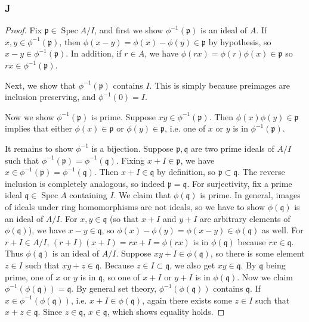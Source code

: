 \documentclass{article}
\newcommand{\frkp}{\mathfrak{p}}
\newcommand{\frkq}{\mathfrak{q}}
\DeclareMathOperator{\Spec}{\mathrm{Spec}}
\begin{document}
\subsubsection{J}\label{3.2.J}
\begin{proof}
    Fix $\frkp \in \Spec A/I$, and first we show $\phi^{-1}(\frkp)$ is an ideal of $A$. If $x,y\in \phi^{-1}(\frkp)$, then $\phi(x-y)=\phi(x)-\phi(y)\in \frkp$ by hypothesis, so $x-y\in \phi^{-1}(\frkp)$. In addition, if $r\in A$, we have $\phi(rx)=\phi(r)\phi(x)\in \frkp$ so $rx\in \phi^{-1}(\frkp)$.

    Next, we show that $\phi^{-1}(\frkp)$ contains $I$. This is simply because preimages are inclusion preserving, and $\phi^{-1}(0)=I$.

    Now we show $\phi^{-1}(\frkp)$ is prime. Suppose $xy\in \phi^{-1}(\frkp)$. Then $\phi(x)\phi(y) \in \frkp$ implies that either $\phi(x)\in \frkp$ or $\phi(y)\in \frkp$, i.e. one of $x$ or $y$ is in $\phi^{-1}(\frkp)$.

    It remains to show $\phi^{-1}$ is a bijection. Suppose $\frkp, \frkq$ are two prime ideals of $A/I$ such that $\phi^{-1}(\frkp)=\phi^{-1}(\frkq)$. Fixing $x+I \in \frkp$, we have $x\in \phi^{-1}(\frkp)=\phi^{-1}(\frkq)$. Then $x+I\in \frkq$ by definition, so $\frkp\subset \frkq$. The reverse inclusion is completely analogous, so indeed $\frkp=\frkq$. For surjectivity, fix a prime ideal $\frkq\in \Spec A$ containing $I$. We claim that $\phi(\frkq)$ is prime. In general, images of ideals under ring homomorphisms are not ideals, so we have to show $\phi(\frkq)$ is an ideal of $A/I$. For $x,y\in \frkq$ (so that $x+I$ and $y+I$ are arbitrary elements of $\phi(\frkq)$), we have $x-y\in \frkq$, so $\phi(x)-\phi(y)=\phi(x-y)\in \phi(\frkq)$ as well. For $r+I\in A/I$, $(r+I)(x+I)=rx+I=\phi(rx)$ is in $\phi(\frkq)$ because $rx\in \frkq$. Thus $\phi(\frkq)$ is an ideal of $A/I$. Suppose $xy+I \in \phi(\frkq)$, so there is some element $z\in I$ such that $xy+z\in \frkq$. Because $z\in I\subset \frkq$, we also get $xy\in \frkq$. By $\frkq$ being prime, one of $x$ or $y$ is in $\frkq$, so one of $x+I$ or $y+I$ is in $\phi(\frkq)$. Now we claim $\phi^{-1}(\phi(\frkq))= \frkq$. By general set theory, $\phi^{-1}(\phi(\frkq))$ contains $\frkq$. If $x\in \phi^{-1}(\phi(\frkq))$, i.e. $x+I \in \phi(\frkq)$, again there exists some $z\in I$ such that $x+z\in \frkq$. Since $z\in \frkq$, $x\in \frkq$, which shows equality holds.
\end{proof}
\end{document}
